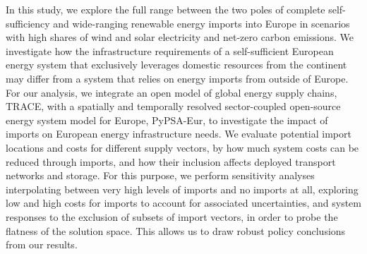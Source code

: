 \documentclass[5p,10pt]{elsarticle}
\begin{document}
In this study, we explore the full range between the two poles of complete
self-sufficiency and wide-ranging renewable energy imports into Europe in
scenarios with high shares of wind and solar electricity and net-zero carbon
emissions. We investigate how the infrastructure requirements of a
self-sufficient European energy system that exclusively leverages domestic
resources from the continent may differ from a system that relies on energy
imports from outside of Europe. For our analysis, we integrate an open model of
global energy supply chains, TRACE,\cite{hamppImportOptions2023} with a
spatially and temporally resolved sector-coupled open-source energy system model
for Europe, PyPSA-Eur,\cite{PyPSAEurSecSectorCoupled} to investigate the impact
of imports on European energy infrastructure needs. We evaluate potential import
locations and costs for different supply vectors, by how much system costs can
be reduced through imports, and how their inclusion affects deployed transport
networks and storage. For this purpose, we perform sensitivity analyses
interpolating between very high levels of imports and no imports at all,
exploring low and high costs for imports to account for associated
uncertainties, and system responses to the exclusion of subsets of import
vectors, in order to probe the flatness of the solution space. This allows us to
draw robust policy conclusions from our results.
\end{document}
